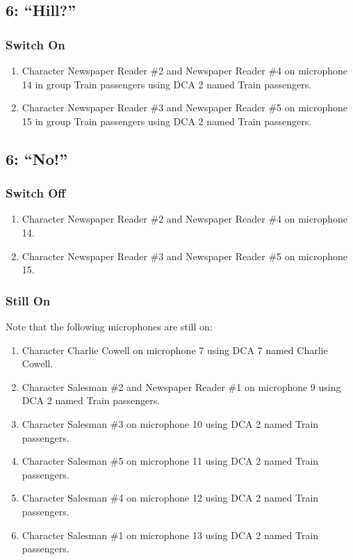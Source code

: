 \subsection* {6: ``Hill?''}
\subsubsection* {Switch On}
\begin{enumerate}
\item Character Newspaper Reader \#2 and Newspaper Reader \#4 on microphone 14 in group Train passengers using DCA 2 named Train passengers.
\item Character Newspaper Reader \#3 and Newspaper Reader \#5 on microphone 15 in group Train passengers using DCA 2 named Train passengers.
\end{enumerate}
\subsection* {6: ``No!''}
\subsubsection* {Switch Off}
\begin{enumerate}
\item Character Newspaper Reader \#2 and Newspaper Reader \#4 on microphone 14.
\item Character Newspaper Reader \#3 and Newspaper Reader \#5 on microphone 15.
\end{enumerate}
\subsubsection* {Still On}
Note that the following microphones are still on:
\begin{enumerate}
\item Character Charlie Cowell on microphone 7 using DCA 7 named Charlie Cowell.
\item Character Salesman \#2 and Newspaper Reader \#1 on microphone 9 using DCA 2 named Train passengers.
\item Character Salesman \#3 on microphone 10 using DCA 2 named Train passengers.
\item Character Salesman \#5 on microphone 11 using DCA 2 named Train passengers.
\item Character Salesman \#4 on microphone 12 using DCA 2 named Train passengers.
\item Character Salesman \#1 on microphone 13 using DCA 2 named Train passengers.
\end{enumerate}
